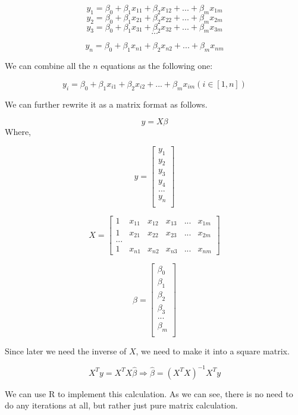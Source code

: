 \documentclass[]{book}
\begin{document}
\[y_1=\beta_0+\beta_1 x_{11}+\beta_2 x_{12}+...+ \beta_m x_{1m}\]
\[y_2=\beta_0+\beta_1 x_{21}+\beta_2 x_{22}+...+ \beta_m x_{2m}\]
\[y_3=\beta_0+\beta_1 x_{31}+\beta_2 x_{32}+...+ \beta_m x_{3m}\]
\[...\]

\[y_n=\beta_0+\beta_1 x_{n1}+\beta_2 x_{n2}+...+ \beta_m x_{nm}\]

We can combine all the \(n\) equations as the following one:

\[y_i=\beta_0+\beta_1 x_{i1}+\beta_2 x_{i2}+...+ \beta_m x_{im}  (i \in [1,n])\]

We can further rewrite it as a matrix format as follows.

\[y= X \beta\] Where,

\[y = \begin{bmatrix}y_1 \\
y_2 \\
y_3 \\
y_4 \\
...\\
y_n \\
\end{bmatrix}\]

\[X=\begin{bmatrix}
1 & x_{11} & x_{12} & x_{13} & ... & x_{1m}\\
1 & x_{21} & x_{22} & x_{23} & ... & x_{2m} \\
...\\
1 & x_{n1} & x_{n2} & x_{n3} & ... & x_{nm}
\end{bmatrix}\]

\[\beta = \begin{bmatrix}\beta_0 \\
\beta_1 \\
\beta_2 \\
\beta_3 \\
...\\
\beta_m \\
\end{bmatrix}\]

Since later we need the inverse of \(X\), we need to make it into a
square matrix.

\[X^Ty=X^TX \hat{\beta} \Rightarrow \hat{\beta} = (X^TX)^{-1} X^Ty\]

We can use R to implement this calculation. As we can see, there is no
need to do any iterations at all, but rather just pure matrix
calculation.
\end{document}
